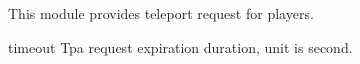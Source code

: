 
This module provides teleport request for players.



\begin{Configuration}
    \item[timeout]{
        Tpa request expiration duration, unit is second.
    }
\end{Configuration}


